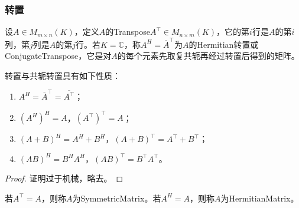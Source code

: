 \subsubsection{转置}
\begin{definition}
	设$A\in M_{m\times n}(K)$，定义$A$的\gls{Transpose}$A^{\top}\in M_{n\times m}(K)$，它的第$i$行是$A$的第$i$列，第$j$列是$A$的第$j$行。若$K=\mathbb{C}$，称$A^H=\overline{A}^{\top}$为$A$的Hermitian转置或\gls{ConjugateTranspose}，它是对$A$的每个元素先取复共轭再经过转置后得到的矩阵。
\end{definition}
\begin{property}\label{prop:Transpose}
	转置与共轭转置具有如下性质：
	\begin{enumerate}
		\item $A^H=\overline{A}^{\top}=\overline{A^{\top}}$；
		\item $(A^H)^H=A$，$(A^{\top})^{\top}=A$；
		\item $(A+B)^H=A^H+B^H$，$(A+B)^{\top}=A^{\top}+B^{\top}$；
		\item $(AB)^H=B^HA^H$，$(AB)^{\top}=B^{\top}A^{\top}$。
	\end{enumerate}
\end{property}
\begin{proof}
	证明过于机械，略去。
\end{proof}
\begin{definition}
	若$A^{\top}=A$，则称$A$为\gls{SymmetricMatrix}。若$A^H=A$，则称$A$为\gls{HermitianMatrix}。
\end{definition}
